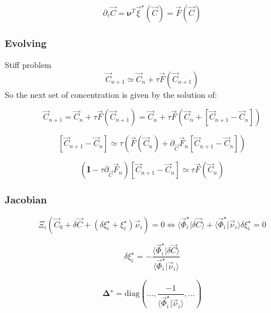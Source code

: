\documentclass[aps,12pt]{revtex4}
\begin{document}
\begin{equation}
\partial_\tau \vec C = \bm{\nu}^T \vec \xi^\star(\vec C) = \vec F(\vec C)
\end{equation}

\subsubsection{Evolving}
Stiff problem
\begin{equation}
	\vec C_{n+1}  \simeq  \vec C_{n} + \tau \vec F(\vec C_{n+1})
\end{equation}
So the next set of concentration is given by the solution of:
 
\begin{equation}
	\vec C_{n+1}   = \vec C_{n} + \tau \vec F(\vec C_{n+1}) = \vec C_{n} + \tau \vec F(\vec C_n + \left[ \vec C_{n+1} - \vec C_n \right] )
\end{equation}

\begin{equation}
	\left[ \vec C_{n+1} - \vec C_n \right] \simeq \tau \left( \vec F(\vec C_n) + \partial_{\vec C} \vec{F}_n \left[ \vec C_{n+1} - \vec C_n \right]\right)
\end{equation}

\begin{equation}
\left(\bm{I}-\tau \partial_{\vec C} \vec{F}_n \right) \left[ \vec C_{n+1} - \vec C_n \right] \simeq \tau   \vec F(\vec C_n)
\end{equation}
 
\subsubsection{Jacobian}

\begin{equation}
	\Xi_i(\vec C_0 +  \delta \vec C + (\delta\xi_i^\star +\xi_i^\star) \vec \nu _i) = 0
	\iff
	\langle \vec \Phi_i^\star \vert \delta \vec C\rangle + \langle \vec \Phi_i^\star \vert \vec\nu_i \rangle \delta \xi_i^\star = 0
\end{equation}

\begin{equation}
	\delta \xi_i^\star = - \dfrac{\langle \vec \Phi_i^\star \vert \delta \vec C\rangle}{\langle \vec \Phi_i^\star \vert \vec\nu_i \rangle}
\end{equation}

 \begin{equation}
 \bm{\Delta}^\star = \mathrm{diag}\left(\ldots,\dfrac{-1}{\langle \vec \Phi_i^\star \vert \vec\nu_i \rangle},\ldots\right)
\end{equation}
\end{document}
